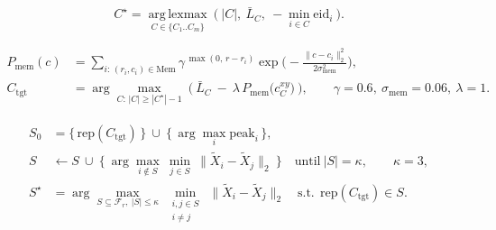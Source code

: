 \begin{equation}
C^\star=\operatorname*{arg\,lexmax}_{C\in\{C_1..C_m\}}\ \big(\ |C|,\ \bar L_{C},\ -\!\min_{i\in C}\mathrm{eid}_i\ \big).
\label{eq:dominant}
\end{equation}

\begin{align}
P_{\mathrm{mem}}(c)&=\sum_{i:\,(r_i,c_i)\in\mathrm{Mem}}\gamma^{\,\max(0,\,r-r_i)}\exp\!\Big(-\tfrac{\|c-c_i\|_2^2}{2\sigma_{\mathrm{mem}}^2}\Big),\nonumber\\
C_{\mathrm{tgt}}&=\arg\max_{C:\,|C|\ge|C^\star|-1}\ \Big(\ \bar L_{C}\ -\ \lambda\,P_{\mathrm{mem}}\big(c^{xy}_{C}\big)\ \Big),\qquad \gamma=0.6,\ \sigma_{\mathrm{mem}}=0.06,\ \lambda=1.
\label{eq:memory}
\end{align}

\begin{align}
S_0&=\big\{\,\mathrm{rep}(C_{\mathrm{tgt}})\,\big\}\ \cup\ \big\{\,\arg\max_i \mathrm{peak}_i\,\big\}, \nonumber\\
S&\leftarrow S\ \cup\ \Big\{\ \arg\max_{i\notin S}\ \min_{j\in S}\ \big\|\tilde X_i-\tilde X_j\big\|_2\ \Big\}\quad\text{until}\ |S|=\kappa,\qquad \kappa=3, \nonumber\\
S^\star&=\arg\max_{S\subseteq\mathcal{F}_r,\ |S|\le\kappa}\ \min_{\substack{i,j\in S\\ i\ne j}}\ \big\|\tilde X_i-\tilde X_j\big\|_2\quad\text{s.t.}\ \ \mathrm{rep}(C_{\mathrm{tgt}})\in S.
\label{eq:diversity}
\end{align}

